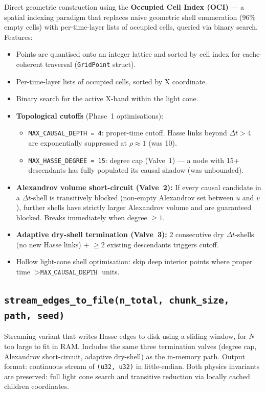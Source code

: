 \documentclass[11pt, a4paper, openany]{book}
\newcommand{\code}[1]{\texttt{#1}}
\newcommand{\func}[1]{\texttt{\color{structure}#1}}
\begin{document}
Direct geometric construction using the \textbf{Occupied Cell Index (OCI)} --- a
spatial indexing paradigm that replaces naive geometric shell enumeration (96\%
empty cells) with per-time-layer lists of occupied cells, queried via binary
search.  Features:
\begin{itemize}
  \item Points are quantised onto an integer lattice and sorted by cell index
        for cache-coherent traversal (\code{GridPoint} struct).
  \item Per-time-layer lists of occupied cells, sorted by X coordinate.
  \item Binary search for the active X-band within the light cone.
  \item \textbf{Topological cutoffs} (Phase~1 optimisations):
        \begin{itemize}
          \item \code{MAX\_CAUSAL\_DEPTH = 4}: proper-time cutoff.  Hasse links
                beyond $\Delta t > 4$ are exponentially suppressed at $\rho
                \approx 1$ (was 10).
          \item \code{MAX\_HASSE\_DEGREE = 15}: degree cap (Valve~1) --- a node
                with 15+ descendants has fully populated its causal shadow
                (was unbounded).
        \end{itemize}
  \item \textbf{Alexandrov volume short-circuit (Valve~2):} If every causal
        candidate in a $\Delta t$-shell is transitively blocked (non-empty
        Alexandrov set between $u$ and $v$), further shells have strictly
        larger Alexandrov volume and are guaranteed blocked.  Breaks
        immediately when degree $\ge 1$.
  \item \textbf{Adaptive dry-shell termination (Valve~3):} 2 consecutive
        dry $\Delta t$-shells (no new Hasse links) $+$ $\ge 2$ existing
        descendants triggers cutoff.
  \item Hollow light-cone shell optimisation: skip deep interior points where
        proper time $> \code{MAX\_CAUSAL\_DEPTH}$ units.
\end{itemize}

\subsection{\func{stream\_edges\_to\_file(n\_total, chunk\_size, path, seed)}}

Streaming variant that writes Hasse edges to disk using a sliding window, for
$N$ too large to fit in RAM.  Includes the same three termination valves
(degree cap, Alexandrov short-circuit, adaptive dry-shell) as the in-memory
path.  Output format: continuous stream of \code{(u32, u32)} in little-endian.
Both physics invariants are preserved: full light cone search and transitive
reduction via locally cached children coordinates.
\end{document}
